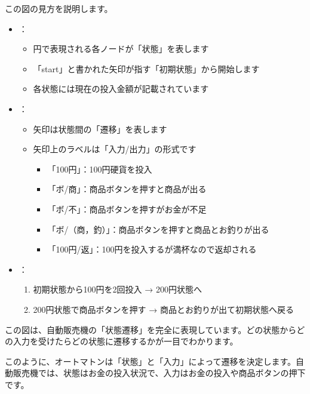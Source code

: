 この図の見方を説明します。

\begin{itemize}
\item
  ：

  \begin{itemize}
  \item
    円で表現される各ノードが「状態」を表します
  \item
    「start」と書かれた矢印が指す「初期状態」から開始します
  \item
    各状態には現在の投入金額が記載されています
  \end{itemize}
\item
  ：

  \begin{itemize}
  \item
    矢印は状態間の「遷移」を表します
  \item
    矢印上のラベルは「入力/出力」の形式です

    \begin{itemize}
    \item
      「100円」：100円硬貨を投入
    \item
      「ボ/商」：商品ボタンを押すと商品が出る
    \item
      「ボ/不」：商品ボタンを押すがお金が不足
    \item
      「ボ/（商，釣）」：商品ボタンを押すと商品とお釣りが出る
    \item
      「100円/返」：100円を投入するが満杯なので返却される
    \end{itemize}
  \end{itemize}
\item
  ：

  \begin{enumerate}
  \item
    初期状態から100円を2回投入 → 200円状態へ
  \item
    200円状態で商品ボタンを押す → 商品とお釣りが出て初期状態へ戻る
  \end{enumerate}
\end{itemize}

この図は、自動販売機の「状態遷移」を完全に表現しています。どの状態からどの入力を受けたらどの状態に遷移するかが一目でわかります。

このように、オートマトンは「状態」と「入力」によって遷移を決定します。自動販売機では、状態はお金の投入状況で、入力はお金の投入や商品ボタンの押下です。

